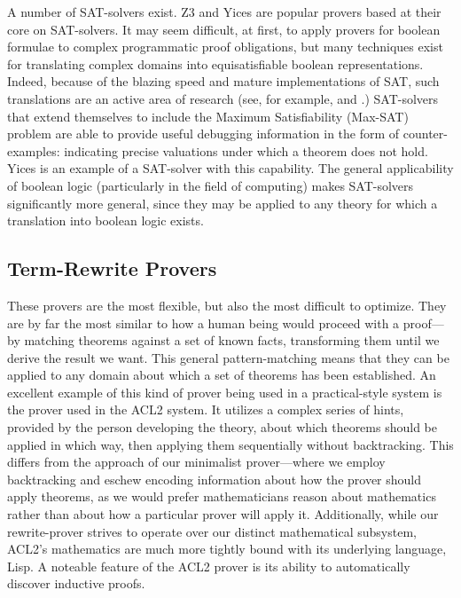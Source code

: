 A number of SAT-solvers exist.  Z3 and Yices\cite{yices} are popular provers based at their core on SAT-solvers.  It may seem difficult, at first, to apply provers for boolean formulae to complex programmatic proof obligations, but many techniques exist for translating complex domains into equisatisfiable boolean representations.  Indeed, because of the blazing speed and mature implementations of SAT, such translations are an active area of research (see, for example, \cite{ganeshArrayDecision} and \cite{sheiniIntegerDecision}.)  SAT-solvers that extend themselves to include the Maximum Satisfiability (Max-SAT) problem are able to provide useful debugging information in the form of counter-examples: indicating precise valuations under which a theorem does not hold.  Yices is an example of a SAT-solver with this capability.  The general applicability of boolean logic (particularly in the field of computing) makes SAT-solvers significantly more general, since they may be applied to any theory for which a translation into boolean logic exists.

\subsection{Term-Rewrite Provers}  These provers are the most flexible, but also the most difficult to optimize.  They are by far the most similar to how a human being would proceed with a proof---by matching theorems against a set of known facts, transforming them until we derive the result we want.  This general pattern-matching means that they can be applied to any domain about which a set of theorems has been established.  An excellent example of this kind of prover being used in a practical-style system is the prover used in the ACL2 system.  It utilizes a complex series of hints, provided by the person developing the theory, about which theorems should be applied in which way, then applying them sequentially without backtracking.  This differs from the approach of our minimalist prover---where we employ backtracking and eschew encoding information about how the prover should apply theorems, as we would prefer mathematicians reason about mathematics rather than about how a particular prover will apply it.  Additionally, while our rewrite-prover strives to operate over our distinct mathematical subsystem, ACL2's mathematics are much more tightly bound with its underlying language, Lisp.  A noteable feature of the ACL2 prover is its ability to automatically discover inductive proofs.

